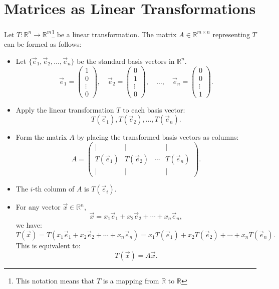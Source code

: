 \documentclass[10pt]{article}
\theoremstyle{plain}
\theoremstyle{definition}
\theoremstyle{remark}
\begin{document}
\section{Matrices as Linear Transformations}

Let \( T: \mathbb{R}^n \to \mathbb{R}^m \)\footnote{This notation means that \(T\) is a mapping from \(\mathbb{R} \text{ to }\mathbb{R}\)} be a linear transformation. The matrix \( A \in \mathbb{R}^{m \times n} \) representing \( T \) can be formed as follows:

\begin{itemize}
    \item Let \( \{ \vec{e}_1, \vec{e}_2, \ldots, \vec{e}_n \} \) be the standard basis vectors in \(\mathbb{R}^n\).
    \[
    \vec{e}_1 = \begin{pmatrix} 1 \\ 0 \\ \vdots \\ 0 \end{pmatrix}, \quad
    \vec{e}_2 = \begin{pmatrix} 0 \\ 1 \\ \vdots \\ 0 \end{pmatrix}, \quad \ldots, \quad
    \vec{e}_n = \begin{pmatrix} 0 \\ 0 \\ \vdots \\ 1 \end{pmatrix}.
    \]

    \item Apply the linear transformation \( T \) to each basis vector:
    \[
    T(\vec{e}_1), T(\vec{e}_2), \ldots, T(\vec{e}_n).
    \]

    \item Form the matrix \( A \) by placing the transformed basis vectors as columns:
    \[
    A = \begin{pmatrix} | & | & & | \\
    T(\vec{e}_1) & T(\vec{e}_2) & \cdots & T(\vec{e}_n) \\
    | & | & & | \end{pmatrix}.
    \]

    \item The \( i \)-th column of \( A \) is \( T(\vec{e}_i) \).

    \item For any vector \(\vec{x} \in \mathbb{R}^n\),
    \[
    \vec{x} = x_1 \vec{e}_1 + x_2 \vec{e}_2 + \cdots + x_n \vec{e}_n,
    \]
    we have:
    \[
    T(\vec{x}) = T(x_1 \vec{e}_1 + x_2 \vec{e}_2 + \cdots + x_n \vec{e}_n) = x_1 T(\vec{e}_1) + x_2 T(\vec{e}_2) + \cdots + x_n T(\vec{e}_n).
    \]
    This is equivalent to:
    \[
    T(\vec{x}) = A \vec{x}.
    \]
\end{itemize}
\end{document}
